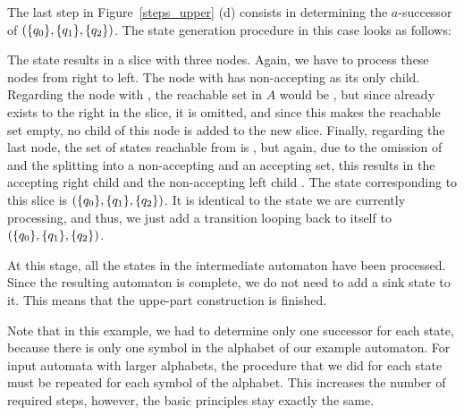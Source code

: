 The last step in Figure~\ref{steps_upper} (d) consists in determining the $a$-successor of $(\{q_{0}\}, \{q_{1}\}, \{q_{2}\})$. The state generation procedure in this case looks as follows:

\begin{center}
\SlicesThree
\end{center}

The state results in a slice with three nodes. Again, we have to process these nodes from right to left. The node with  has non-accepting  as its only child. Regarding the node with , the reachable set in $A$ would be , but since  already exists to the right in the slice, it is omitted, and since this makes the reachable set empty, no child of this node is added to the new slice. Finally, regarding the last node, the set of states reachable from  is , but again, due to the omission of  and the splitting into a non-accepting and an accepting set, this results in the accepting right child  and the non-accepting left child . The state corresponding to this slice is $(\{q_{0}\}, \{q_{1}\}, \{q_{2}\})$. It is identical to the state we are currently processing, and thus, we just add a transition looping back to itself to $(\{q_{0}\}, \{q_{1}\}, \{q_{2}\})$.

At this stage, all the states in the intermediate automaton have been processed. Since the resulting automaton is complete, we do not need to add a sink state to it. This means that the uppe-part construction is finished.

Note that in this example, we had to determine only one successor for each state, because there is only one symbol in the alphabet of our example automaton. For input automata with larger alphabets, the procedure that we did for each state must be repeated for each symbol of the alphabet. This increases the number of required steps, however, the basic principles stay exactly the same.





